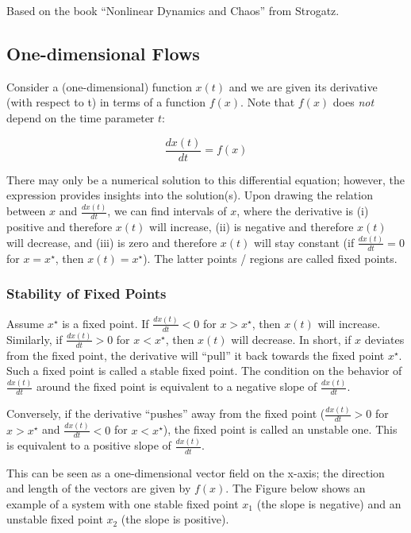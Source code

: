 
Based on the book ``Nonlinear Dynamics and Chaos'' from Strogatz.

\subsection{One-dimensional Flows}

Consider a (one-dimensional) function $x(t)$ and we are given its derivative (with respect to t) in terms of a function $f(x)$. Note that $f(x)$ does \emph{not} depend on the time parameter $t$:

\[
\frac{dx(t)}{dt} = f(x)
\]

There may only be a numerical solution to this differential equation; however, the expression provides insights into the solution(s). Upon drawing the relation between $x$ and $\frac{dx(t)}{dt}$, we can find intervals of $x$, where the derivative is (i) positive and therefore $x(t)$ will increase, (ii) is negative and therefore $x(t)$ will decrease, and (iii) is zero and therefore $x(t)$ will stay constant (if $\frac{dx(t)}{dt} = 0$ for $x=x^\star$, then $x(t)=x^\star$). The latter points / regions are called fixed points.

\subsubsection{Stability of Fixed Points}

Assume $x^\star$ is a fixed point. If $\frac{dx(t)}{dt} < 0$ for $x > x^\star$, then $x(t)$ will increase. Similarly, if $\frac{dx(t)}{dt} > 0$ for $x < x^\star$, then $x(t)$ will decrease. In short, if $x$ deviates from the fixed point, the derivative will ``pull'' it back towards the fixed point $x^\star$. Such a fixed point is called a stable fixed point. The condition on the behavior of $\frac{dx(t)}{dt}$ around the fixed point is equivalent to a negative slope of $\frac{dx(t)}{dt}$.

Conversely, if the derivative ``pushes'' away from the fixed point ($\frac{dx(t)}{dt} > 0$ for $x > x^\star$ and $\frac{dx(t)}{dt} < 0$ for $x < x^\star$), the fixed point is called an unstable one. This is equivalent to a positive slope of $\frac{dx(t)}{dt}$.

This can be seen as a one-dimensional vector field on the x-axis; the
direction and length of the vectors are given by $f(x)$. The Figure below shows an example of a system with one stable fixed point $x_1$ (the slope is negative) and an unstable fixed point $x_2$ (the slope
is positive).

